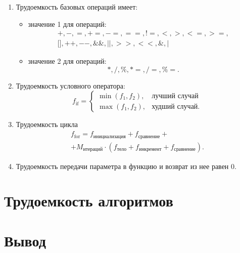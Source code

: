 \begin{enumerate}
    \item Трудоемкость базовых операций имеет:
    \begin{itemize}
        \item значение 1 для операций:
        \begin{equation}
            \begin{gathered}
                +, -, =, +=, -=, ==, !=, <, >, <=, >=, \\ 
                \text{[]}, ++, --, \&\&, ||, >>, <<, \&, |
            \end{gathered}
        \end{equation}
        \item значение 2 для операций:
        \begin{equation}
            *, /, \%, *=, /=, \%=.
        \end{equation}
    \end{itemize}
    \item Трудоемкость условного оператора:
    \begin{equation}
        f_{\text{if}} =
        \begin{cases}
            \min({f_1, f_2}), & \text{лучший случай} \\
            \max({f_1, f_2}), & \text{худший случай}.
        \end{cases}
    \end{equation}
    \item Трудоемкость цикла
    \begin{equation}
        \begin{gathered}
            f_{\text{for}} = f_{\text{инициализация}} + f_{\text{сравнение}} + \\
            + M_{\text{итераций}} \cdot (f_{\text{тело}} + f_{\text{инкремент}} + f_{\text{сравнение}}).
        \end{gathered} 
    \end{equation}
    \item Трудоемкость передачи параметра в функцию и возврат из нее равен 0.
\end{enumerate}

\section{Трудоемкость алгоритмов}

\section*{Вывод}
